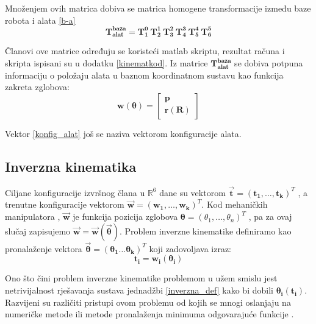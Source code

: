 \documentclass[times, utf8, diplomski, numeric]{fer}
\begin{document}
Množenjem ovih matrica dobiva se matrica homogene transformacije između baze robota i alata \ref{b-a}
\begin{equation}
\mathbf{T_{alat}^{baza}} = \mathbf{T_1^0}\ \mathbf{T_2^1}\ \mathbf{T_3^2}\ \mathbf{T_4^3}\ \mathbf{T_5^4}\ \mathbf{T_6^5}
\label{b-a}
\end{equation}

Članovi ove matrice određuju se koristeći matlab skriptu, rezultat računa i skripta ispisani su u dodatku \ref{kinematkod}.
Iz matrice $\mathbf{T_{alat}^{baza}}$  se dobiva potpuna informaciju o položaju alata u baznom koordinatnom sustavu kao funkcija zakreta zglobova:
\begin{equation}
\mathbf{w}(\bm \theta) = 
\begin{bmatrix}
\mathbf{p}\\
\mathbf{r}(\mathbf{R})
\end{bmatrix}
\label{konfig_alat}
\end{equation}

Vektor \ref{konfig_alat} još se naziva vektorom konfiguracije alata.

\subsection{Inverzna kinematika}
Ciljane konfiguracije izvršnog člana u $\mathbb{R}^{6}$ dane su vektorom $\vec{\mathbf{t}} = (\mathbf{t_1}, \ldots , \mathbf{t_k})^{T}$ , a trenutne konfiguracije vektorom
$\vec{\mathbf{w}} = (\mathbf{w_1}, \ldots , \mathbf{w_k})^{T}$. Kod mehaničkih manipulatora , $\vec{\mathbf{w}}$ je funkcija pozicija zglobova ${\bm{\theta}} = (\theta_{1}, \ldots , \theta_{n})^{T}$ , pa za ovaj slučaj zapisujemo $\vec{\mathbf{w}}=\vec{\mathbf{w}}\left({\vec{\bm{\theta}}}\right) $.
Problem inverzne kinematike definiramo kao pronalaženje vektora $\vec{\bm{\theta}} = (\bm{\theta_1} \ldots \bm{\theta_k})^T$ koji zadovoljava izraz:
\begin{equation}
\mathbf{t_i} = \mathbf{w_i}(\bm{\theta}_{\mathbf{i}})
\label{inverzna_def}
\end{equation}

Ono što čini problem inverzne kinematike problemom u užem smislu jest netrivijalnost rješavanja sustava jednadžbi \ref{inverzna_def} kako bi dobili $\bm{\theta}_{\mathbf{i}}(\mathbf{t_i})$. 
Razvijeni su različiti pristupi ovom problemu od kojih se mnogi oslanjaju na numeričke metode ili metode pronalaženja minimuma odgovarajuće funkcije \cite{wang1991combined}.
\end{document}
